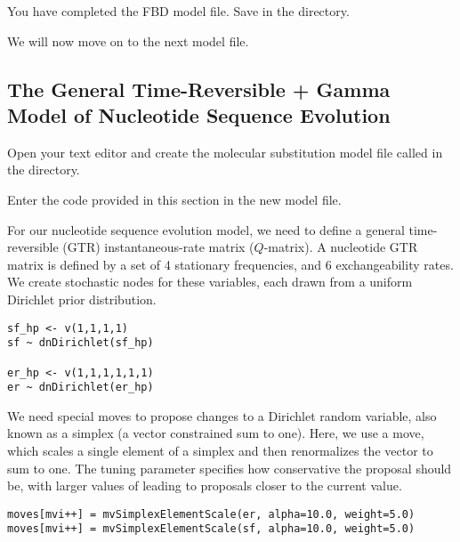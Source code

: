 {\begin{framed}
You have completed the FBD model file. Save  in the  directory.

We will now move on to the next model file.
\end{framed}}


\bigskip

\subsection{The General Time-Reversible + Gamma Model of Nucleotide Sequence Evolution}\label{subsect:Exercise-ModelGTRG}

{\begin{framed}
Open your text editor and create the molecular substitution model file called {\textcolor{red}{}} in the  directory.

Enter the \Rev code provided in this section in the new model file.
\end{framed}}

For our nucleotide sequence evolution model, we need to define a general time-reversible (GTR) instantaneous-rate matrix (\IE $Q$-matrix).
A nucleotide GTR matrix is defined by a set of 4 stationary frequencies, and 6 exchangeability rates.
We create stochastic nodes for these variables, each drawn from a uniform Dirichlet prior distribution.

{\tt \begin{snugshade*}
\begin{lstlisting}
sf_hp <- v(1,1,1,1)
sf ~ dnDirichlet(sf_hp)

er_hp <- v(1,1,1,1,1,1)
er ~ dnDirichlet(er_hp)
\end{lstlisting}
\end{snugshade*}}

We need special moves to propose changes to a Dirichlet random variable, also known as a simplex (a vector constrained sum to one).
Here, we use a  move, which scales a single element of a simplex and then renormalizes the vector to sum to one.
The tuning parameter  specifies how conservative the proposal should be, with larger values of  leading to proposals closer to the current value.
{\tt \begin{snugshade*}
\begin{lstlisting}
moves[mvi++] = mvSimplexElementScale(er, alpha=10.0, weight=5.0)
moves[mvi++] = mvSimplexElementScale(sf, alpha=10.0, weight=5.0)
\end{lstlisting}
\end{snugshade*}}

